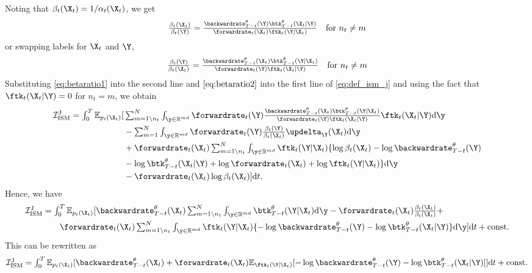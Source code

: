Noting that $\beta_t(\X_t) = 1 / \alpha_t(\X_t)$, we get 
\begin{equation}
    \textstyle \frac{\beta_t ( \X_t)}{\beta_t(\Y)} = \frac{\backwardrate_{T-t}^\theta (\Y) \btk_{T-t}^\theta(\X_t | \Y)}{\forwardrate_t(\X_t) \ftk_t(\Y | \X_t)} \quad \text{for } n_t \neq m
    \label{eq:betaratio1}
\end{equation}
or swapping labels for $\X_t$ and $\Y$,
\begin{equation}
    \textstyle \frac{\beta_t ( \Y)}{\beta_t(\X_t)} = \frac{\backwardrate_{T-t}^\theta (\X_t) \btk_{T-t}^\theta(\Y | \X_t)}{\forwardrate_t(\Y) \ftk_t(\X_t | \Y)} \quad \text{for } n_t \neq m
    \label{eq:betaratio2}
\end{equation}
Substituting \eqref{eq:betaratio1} into the second line and
$\eqref{eq:betaratio2}$ into the first line of \eqref{eq:def_ism_j} and using
the fact that $\ftk_t(\X_t | \Y) = 0$ for $n_t = m$, we obtain
\begin{align}
    \mathcal{I}_{\text{ISM}}^{\text{J}} = \textstyle \int_0^T \mathbb{E}_{p_t(\X_t)} [&\textstyle  \intyNont \forwardrate_t(\Y)  \frac{\backwardrate_{T-t}^\theta (\X_t) \btk_{T-t}^\theta(\Y | \X_t)}{\forwardrate_t(\Y) \ftk_t(\X_t | \Y)} \ftk_t(\X_t | \Y) \rmd \y \\
    &\textstyle - \inty \forwardrate_t(\Y) \frac{\beta_t(\Y)}{\beta_t(\X_t)} \updelta_{\Y} (\X_t)  \rmd\y \\
    &\textstyle +\forwardrate_t(\X_t) \intyNont \ftk_t(\Y | \X_t) \{ \log \beta_t(\X_t) - \log \backwardrate_{T-t}^\theta(\Y) \\ & \textstyle - \log \btk_{T-t}^\theta(\X_t | \Y) 
    \textstyle   + \log \forwardrate_t(\X_t) + \log \ftk_t(\Y | \X_t)  \} \rmd \y \\
    &\textstyle - \forwardrate_t(\X_t) \log \beta_t(\X_t)] \rmd t . 
\end{align}
Hence, we have 
\begin{align}
  \textstyle 
    \mathcal{I}_{\text{ISM}}^{\text{J}} &\textstyle = \int_{0}^T \mathbb{E}_{p_t(\X_t)} [\textstyle  \backwardrate_{T-t}^\theta(\X_t) \intyNont \btk_{T-t}^\theta(\Y | \X_t) \rmd\y - \forwardrate_t(\X_t) \frac{\beta_t(\X_t)}{\beta_t(\X_t)}  + \\
    & \qquad\textstyle \forwardrate_t(\X_t) \intyNont \ftk_t(\Y | \X_t) \{ -\log \backwardrate_{T-t}^\theta(\Y) - \log \btk_{T-t}^\theta(\X_t | \Y) \} \rmd \y ] \rmd t + \text{const} .
\end{align}
This can be rewritten as 
\begin{align}
  \textstyle 
    \mathcal{I}_{\text{ISM}}^{\text{J}} = \int_{0}^T \mathbb{E}_{p_t(\X_t)} [ \backwardrate_{T-t}^\theta(\X_t) + \forwardrate_t(\X_t) \mathbb{E}_{\ftk_t(\Y | \X_t)} [ - \log \backwardrate_{T-t}^\theta(\Y) - \log \btk_{T-t}^\theta(\X_t | \Y) ] ] \rmd t + \text{const} . 
\end{align}
